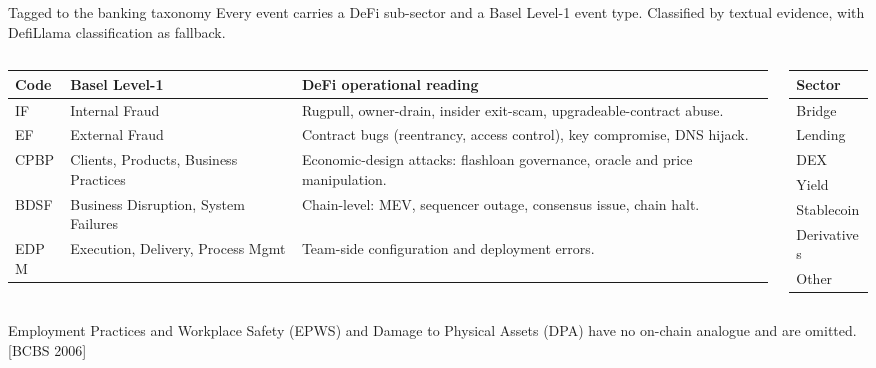 \documentclass[10pt,xcolor=x11names,aspectratio=169]{beamer}
\newcommand{\src}[1]{[#1]}
\begin{document}
\begin{frame}{Tagged to the banking taxonomy}
  Every event carries a DeFi sub-sector and a Basel Level-1 event type.
  Classified by textual evidence, with DefiLlama classification as fallback.
  \vskip 2mm
  \begin{columns}[T]
    \begin{column}{0.76\textwidth}
      \footnotesize\setlength{\tabcolsep}{3pt}
      \begin{tabular}{l >{\raggedright\arraybackslash}p{2.6cm} >{\raggedright\arraybackslash}p{6.0cm}}
        \toprule
        Code & Basel Level-1 & DeFi operational reading \\
        \midrule
        IF   & Internal Fraud & Rugpull, owner-drain, insider exit-scam, upgradeable-contract abuse. \\
        EF   & External Fraud & Contract bugs (reentrancy, access control), key compromise, DNS hijack. \\
        CPBP & Clients, Products, Business Practices & Economic-design attacks: flashloan governance, oracle and price manipulation. \\
        BDSF & Business Disruption, System Failures & Chain-level: MEV, sequencer outage, consensus issue, chain halt. \\
        EDPM & Execution, Delivery, Process Mgmt & Team-side configuration and deployment errors. \\
        \bottomrule
      \end{tabular}
    \end{column}
    \begin{column}{0.22\textwidth}
      \footnotesize\setlength{\tabcolsep}{3pt}
      \begin{tabular}{l}
        \toprule
        Sector \\
        \midrule
        Bridge      \\
        Lending     \\
        DEX         \\
        Yield       \\
        Stablecoin  \\
        Derivatives \\
        Other       \\
        \bottomrule
      \end{tabular}
    \end{column}
  \end{columns}
  \vskip 2mm
  \footnotesize
  Employment Practices and Workplace Safety (EPWS) and Damage to Physical
  Assets (DPA) have no on-chain analogue and are omitted. \src{BCBS 2006}
  \normalsize
\end{frame}
\end{document}
